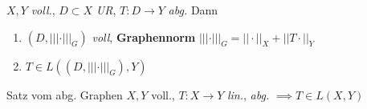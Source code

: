 \begin{lemma}
  $X,Y$ \textit{voll.}, $D\subset X$ \textit{UR}, $T:D \to Y$ \textit{abg.}
  Dann
  \begin{enumerate}[label=(\roman*)]
    \item $(D,|||\cdot|||_G)$ \textit{voll}, \textbf{Graphennorm}
      $|||\cdot|||_G = ||\cdot||_X+||T\cdot||_Y$
    \item $T\in L((D,|||\cdot|||_G) ,Y)$
  \end{enumerate}
\end{lemma}

\begin{satz}{Satz vom abg. Graphen}
  $X,Y$ voll., $T:X \to Y$ \textit{lin.}, \textit{abg.}
  $\implies T\in L(X,Y)$
\end{satz}
